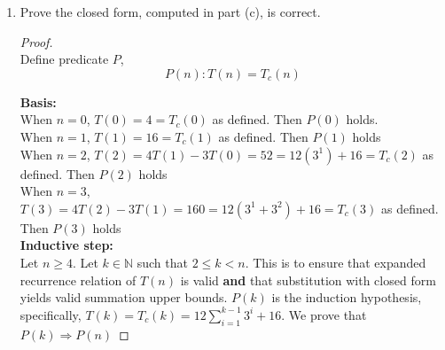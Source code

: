 \documentclass[11pt]{article}
\theoremstyle{plain}%
\theoremstyle{definition}
\theoremstyle{remark}
\newenvironment{solution}
  {\begin{proof}[Solution]}
  {\end{proof}}
\newcommand{\N}{\mathbb{N}}
\begin{document}
\begin{enumerate}
  \begin{solution}
    $ $\\
    Assume $n$ is sufficiently large.
    \begin{align*}
      T_c(n) &= 4T(n-1) - 3T(n-2) \tag{by recurrence relation}\\
      &= 4(4T(n-2) - 3T(n-3)) - 3T(n-2) \tag{by recurrence relation}\\
      &= 13T(n-2) - 12T(n-3) \\
      &= (1+3^1 + 3^2)T(n-2) - (3^1 + 3^2)T(n-3)\\
      &= 13(4T(n-3)-3T(n-4)) - 12T(n-3) \tag{by recurrence relation}\\
      &= 40T(n-3) - 39T(n-4)\\
      &= (1+3^1 + 3^2 + 3^3)T(n-3) - (3^1 + 3^2 + 3^3)T(n-4)\\
      &\vdots\\
      &=(1+\sum_{i=1}^{n-1}(3^i))T(1) - \sum_{i=1}^{n-1}(3^i)T(0)\\
      &=(1+\sum_{i=1}^{n-1}(3^i))16 - \sum_{i=1}^{n-1}(3^i)4 \tag{$T(1) = 16$, $T(0)=4$}\\
      &= 12\sum_{i=1}^{n-1}{3^i} + 16
    \end{align*}
    In summary,
    \begin{equation*}
      T_c(n) =
      \begin{cases}
        4, & n=0\\
        16, & n=1\\
        12\sum_{i=1}^{n-1}{3^i} + 16, & n\geq 2\\
      \end{cases}
    \end{equation*}

  \end{solution}

  \item Prove the closed form, computed in part (c), is correct.

  \begin{proof}
    $ $\\
    Define predicate $P$,
    \[
      P(n): T(n) = T_c(n) \tag{ where $T_c(n)$ is the closed form of $T(n)$}
    \]

    \textbf{Basis:}\\
    When $n=0$, $T(0) = 4 = T_c(0)$ as defined. Then $P(0)$ holds.\\
    When $n=1$, $T(1) = 16 = T_c(1)$ as defined. Then $P(1)$ holds\\
    When $n=2$, $T(2) = 4T(1)-3T(0) = 52 = 12(3^1) + 16 = T_c(2)$ as defined. Then $P(2)$ holds\\
    When $n=3$, $T(3) = 4T(2)-3T(1) = 160 = 12(3^1 + 3^2) + 16 = T_c(3)$ as defined. Then $P(3)$ holds\\
    \textbf{Inductive step:}\\
    Let $n\geq 4$. Let $k\in\N$ such that $2\leq k < n$. This is to ensure that expanded recurrence relation of $T(n)$ is valid \textbf{and} that substitution with closed form yields valid summation upper bounds. $P(k)$ is the induction hypothesis, specifically, $T(k) = T_c(k) = 12\sum_{i=1}^{k-1}{3^i} + 16$. We prove that $P(k) \Rightarrow P(n)$


\end{proof}
\end{enumerate}
\end{document}

